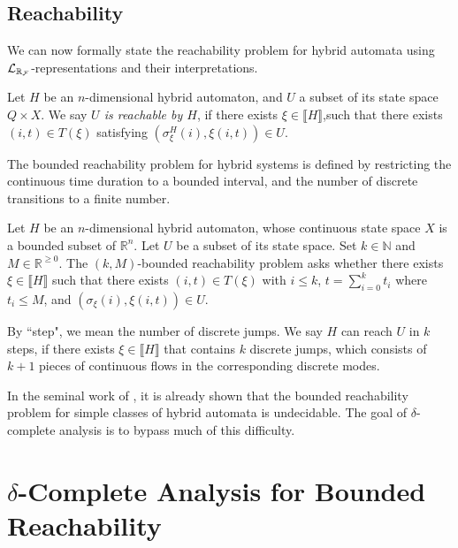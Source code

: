 \documentclass[10pt,envcountsect]{llncs}
\newtheorem{notation}[theorem]{Notation}
\begin{document}
\subsection{Reachability}
We can now formally state the reachability problem for hybrid automata using $\mathcal{L}_{\mathbb{R}_{\mathcal{F}}}$-representations and their interpretations.
\begin{definition}[Reachability]\label{reachability}
Let $H$ be an $n$-dimensional hybrid automaton, and $U$ a subset of its state
space $Q\times X$.  We say {\em $U$ is reachable by $H$}, if there exists
$\xi\in\llbracket
H \rrbracket$,such that there exists $(i,t)\in T(\xi)$ satisfying
$(\sigma^H_{\xi}(i), \xi(i,t))\in U.$
\end{definition}
The bounded reachability problem for hybrid systems is defined by restricting
the continuous time duration to a bounded interval, and the number
of discrete transitions to a finite number.
\begin{definition}
Let $H$ be an $n$-dimensional hybrid automaton, whose continuous state space
$X$ is a bounded subset of $\mathbb{R}^n$. Let $U$ be a subset of its state
space. Set $k\in \mathbb{N}$ and $M \in \mathbb{R}^{\geq 0}$. The {$(k,M)$-bounded
reachability problem} asks whether there exists
$\xi\in\llbracket H \rrbracket$ such that there exists $(i,t)\in T(\xi)$ with $i\leq k$, $t=
\sum_{i=0}^k t_i$ where $t_i \leq M$, and $(\sigma_{\xi}(i), \xi(i,t))\in U.$
\end{definition}
\begin{remark}
By ``step", we mean the number of discrete jumps. We say $H$ can reach $U$ in $k$ steps, if there exists $\xi\in\llbracket H\rrbracket$ that contains $k$ discrete jumps, which consists of $k+1$ pieces of continuous flows in the corresponding discrete modes.
\end{remark}

In the seminal work of \cite{DBLP:conf/rex/AlurD91,DBLP:conf/hybrid/AlurCHH92}, it is already shown that the bounded reachability problem for simple classes of hybrid automata is undecidable. The goal of $\delta$-complete analysis is to bypass much of this difficulty.

\section{$\delta$-Complete Analysis for Bounded Reachability}\label{main}
\end{document}
